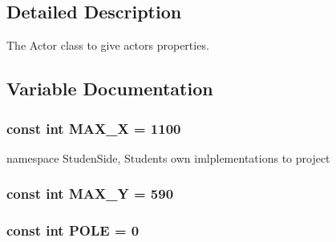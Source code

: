 \subsection{Detailed Description}
The Actor class to give actors properties. 

\subsection{Variable Documentation}
\hypertarget{actor_8hh_a0c83c007cb84afc390feef5197e1e772}{
\subsubsection[{M\-A\-X\-\_\-\-X}]{\setlength{\rightskip}{0pt plus 5cm}const int M\-A\-X\-\_\-\-X = 1100}}\label{actor_8hh_a0c83c007cb84afc390feef5197e1e772}


namespace Studen\-Side, Students own imlplementations to project 

\hypertarget{actor_8hh_a3d568eb994147e9003c8def870db3d15}{
\subsubsection[{M\-A\-X\-\_\-\-Y}]{\setlength{\rightskip}{0pt plus 5cm}const int M\-A\-X\-\_\-\-Y = 590}}\label{actor_8hh_a3d568eb994147e9003c8def870db3d15}
\hypertarget{actor_8hh_ad6dbd24debdca3e21cadbdc23476ad8d}{
\subsubsection[{P\-O\-L\-E}]{\setlength{\rightskip}{0pt plus 5cm}const int P\-O\-L\-E = 0}}\label{actor_8hh_ad6dbd24debdca3e21cadbdc23476ad8d}
